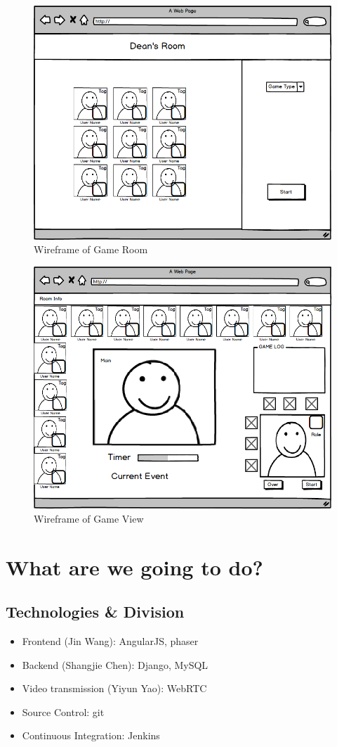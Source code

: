 \documentclass[11pt]{article}
\begin{document}
\begin{figure}
\centering
\includegraphics[width=0.7\linewidth, keepaspectratio]{inroom.png}
\caption{Wireframe of Game Room}
\label{fig:room}
\end{figure}

\begin{figure}
\centering
\includegraphics[width=0.7\linewidth, keepaspectratio]{ingame.png}
\caption{Wireframe of Game View}
\label{fig:game}
\end{figure}

\section{What are we going to do?}
\subsection{Technologies \& Division}
\begin{itemize}
\item
Frontend (Jin Wang): AngularJS, phaser
\item
Backend (Shangjie Chen): Django, MySQL
\item
Video transmission (Yiyun Yao): WebRTC
\item
Source Control: git
\item
Continuous Integration: Jenkins
\end{itemize}
\end{document}
